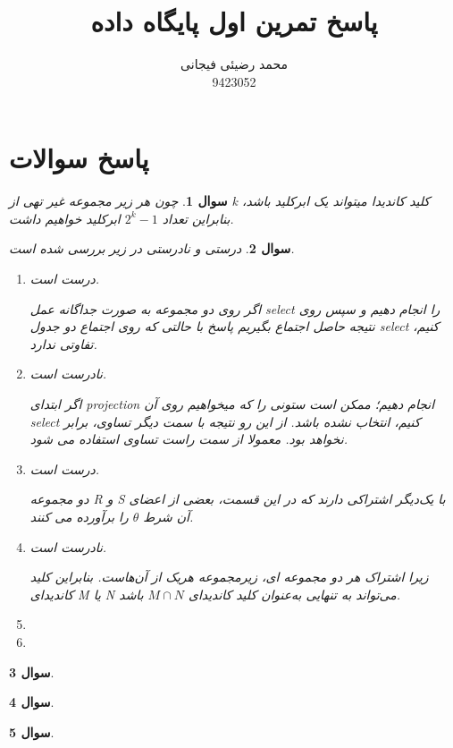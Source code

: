 \documentclass[12pt]{article}
\title{پاسخ تمرین اول پایگاه داده}
\author{محمد رضیئی فیجانی\\ 9423052}
\newtheorem{question}{سوال}
\begin{document}
\maketitle

\section{پاسخ سوالات}\label{chpt1}
\begin{question}
	چون هر زیر مجموعه غیر تهی از k کلید کاندیدا میتواند یک ابرکلید باشد، بنابراین تعداد 
	$2^k - 1$
	ابرکلید خواهیم داشت.
\end{question}
\begin{question}
درستی و نادرستی در زیر بررسی شده است.
\begin{enumerate}
	\item
	درست است.
	
	اگر روی دو مجموعه به صورت جداگانه عمل select را انجام دهیم و سپس روی نتیجه حاصل اجتماع بگیریم پاسخ با حالتی که روی اجتماع دو جدول select کنیم، تفاوتی ندارد.
	
	\item
	نادرست است.
	
	اگر ابتدای projection انجام دهیم؛ ممکن است ستونی را که میخواهیم روی آن select کنیم، انتخاب نشده باشد. از این رو نتیجه با سمت دیگر تساوی، برابر نخواهد بود. معمولا از سمت راست تساوی استفاده می شود.
	
	\item
	درست است.
	
	دو مجموعه R  و S با یک‌دیگر اشتراکی دارند که در این قسمت، بعضی از اعضای آن شرط $\theta$ را برآورده می کنند.
	
	\item
	نادرست است.
	
	زیرا اشتراک هر دو مجموعه ای، زیرمجموعه هریک از آن‌هاست. بنابراین کلید کاندیدای M یا N می‌تواند به تنهایی به‌عنوان کلید کاندیدای $M \cap N$ باشد.
	
	\item

	
	\item
	
	
	
	
	
\end{enumerate}
\end{question}
\begin{question}
	
\end{question}
\begin{question}
	
\end{question}
\begin{question}
	
\end{question}
\end{document}
